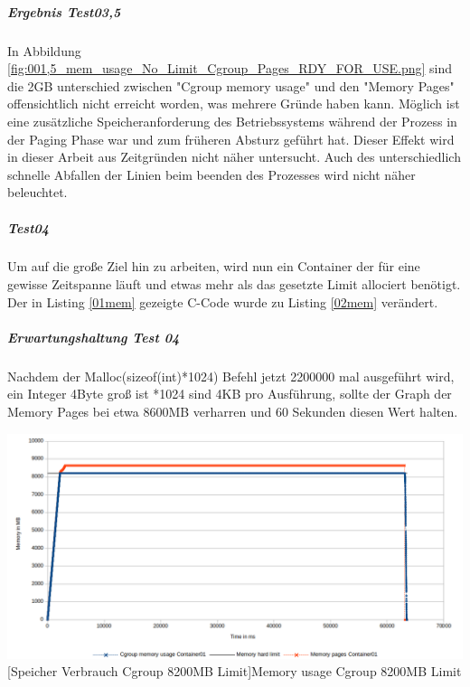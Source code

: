 \subparagraph{Ergebnis Test03,5}
In Abbildung \ref{fig:001,5_mem_usage_No_Limit_Cgroup_Pages_RDY_FOR_USE.png} sind die 2GB unterschied zwischen "Cgroup memory usage" und den "Memory Pages" offensichtlich nicht erreicht worden, was mehrere Gründe haben kann. Möglich ist eine zusätzliche Speicheranforderung des Betriebssystems während der Prozess in der Paging Phase war und zum früheren Absturz geführt hat. Dieser Effekt wird in dieser Arbeit aus Zeitgründen nicht näher untersucht. Auch des unterschiedlich schnelle Abfallen der Linien beim beenden des Prozesses wird nicht näher beleuchtet. 



\subparagraph{Test04}
Um auf die große Ziel hin zu arbeiten, wird nun ein Container der für eine gewisse Zeitspanne läuft und etwas mehr als das gesetzte Limit allociert benötigt. Der in Listing \ref{01mem} gezeigte C-Code wurde zu Listing \ref{02mem} verändert. 

\vspace{1em}


\subparagraph{Erwartungshaltung Test 04}
Nachdem der Malloc(sizeof(int)*1024) Befehl jetzt 2200000 mal ausgeführt wird, ein Integer 4Byte groß ist *1024 sind 4KB pro Ausführung, sollte der Graph der Memory Pages bei etwa 8600MB verharren und 60 Sekunden diesen Wert halten.

\vspace{1em}
\begin{minipage}{\linewidth}
	\centering
	\includegraphics[width=1\linewidth]{pics/004_mem_usage_8200mb_limit_Container01_Basis_RDY_FOR_USE.png}
	[Speicher Verbrauch Cgroup 8200MB Limit]{Memory usage Cgroup 8200MB Limit}
	\label{fig:004_mem_usage_8200mb_limit_Container01_Basis_RDY_FOR_USE}
\end{minipage}

